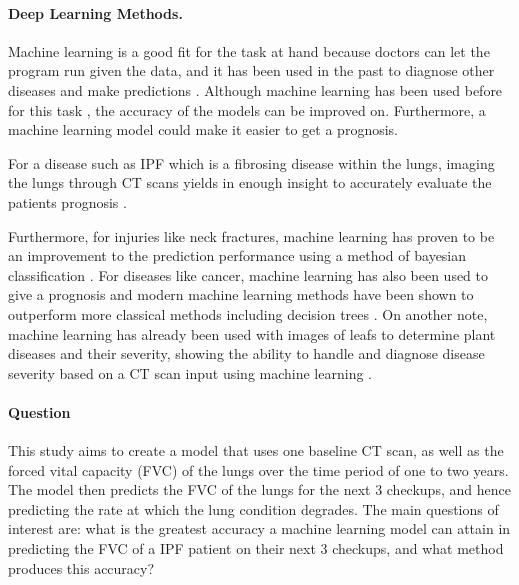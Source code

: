 \documentclass[12pt]{article}
\begin{document}
\paragraph*{Deep Learning Methods.}

Machine learning is a good fit for the task at hand because doctors can let the program run given the data, and it has been used in the past to diagnose other diseases and make predictions \cite{wang2010high}. 
Although machine learning has been used before for this task \cite{robbie2017evaluating,du20146,maldonado2014automated}, the accuracy of the models can be improved on.
Furthermore, a machine learning model could make it easier to get a prognosis.

For a disease such as IPF which is a fibrosing disease within the lungs, imaging the lungs through CT scans yields in enough insight to accurately evaluate the patients prognosis \cite{walsh2018role}.

Furthermore, for injuries like neck fractures, machine learning has proven to be an improvement to the prediction performance using a method of bayesian classification \cite{kukar1996machine}.
For diseases like cancer, machine learning has also been used to give a prognosis and modern machine learning methods have been shown to outperform more classical methods including decision trees \cite{cruz2006applications}.
On another note, machine learning has already been used with images of leafs to determine plant diseases and their severity, showing the ability to handle and diagnose disease severity based on a CT scan input using machine learning \cite{mwebaze2016machine}.

\paragraph*{Question}

This study aims to create a model that uses one baseline CT scan, as well as the forced vital capacity (FVC) of the lungs over the time period of one to two years.
The model then predicts the FVC of the lungs for the next 3 checkups, and hence predicting the rate at which the lung condition degrades. 
The main questions of interest are: what is the greatest accuracy a machine learning model can attain in predicting the FVC of a IPF patient on their next 3 checkups, and what method produces this accuracy? 




\end{document}
